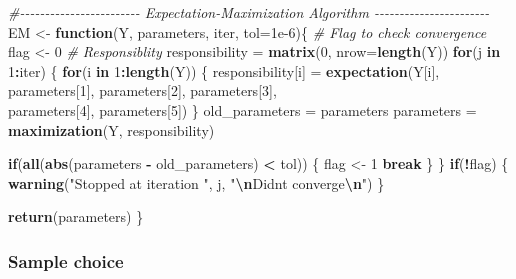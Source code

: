 \documentclass[
]{article}
\newenvironment{Shaded}{\begin{snugshade}}{\end{snugshade}}
\newcommand{\AttributeTok}[1]{\textcolor[rgb]{0.13,0.29,0.53}{#1}}
\newcommand{\CommentTok}[1]{\textcolor[rgb]{0.56,0.35,0.01}{\textit{#1}}}
\newcommand{\ControlFlowTok}[1]{\textcolor[rgb]{0.13,0.29,0.53}{\textbf{#1}}}
\newcommand{\DecValTok}[1]{\textcolor[rgb]{0.00,0.00,0.81}{#1}}
\newcommand{\FloatTok}[1]{\textcolor[rgb]{0.00,0.00,0.81}{#1}}
\newcommand{\FunctionTok}[1]{\textcolor[rgb]{0.13,0.29,0.53}{\textbf{#1}}}
\newcommand{\NormalTok}[1]{#1}
\newcommand{\OtherTok}[1]{\textcolor[rgb]{0.56,0.35,0.01}{#1}}
\newcommand{\SpecialCharTok}[1]{\textcolor[rgb]{0.81,0.36,0.00}{\textbf{#1}}}
\newcommand{\StringTok}[1]{\textcolor[rgb]{0.31,0.60,0.02}{#1}}
\begin{document}
\begin{Shaded}
\begin{Highlighting}[]
\CommentTok{\#{-}{-}{-}{-}{-}{-}{-}{-}{-}{-}{-}{-}{-}{-}{-}{-}{-}{-}{-}{-}{-}{-}{-}{-} Expectation{-}Maximization Algorithm {-}{-}{-}{-}{-}{-}{-}{-}{-}{-}{-}{-}{-}{-}{-}{-}{-}{-}{-}{-}{-}{-}{-}}
\NormalTok{EM }\OtherTok{\textless{}{-}} \ControlFlowTok{function}\NormalTok{(Y, parameters, iter, }\AttributeTok{tol=}\FloatTok{1e{-}6}\NormalTok{)\{}
  \CommentTok{\# Flag to check convergence}
\NormalTok{  flag }\OtherTok{\textless{}{-}} \DecValTok{0}
  \CommentTok{\# Responsiblity }
\NormalTok{  responsibility }\OtherTok{=} \FunctionTok{matrix}\NormalTok{(}\DecValTok{0}\NormalTok{, }\AttributeTok{nrow=}\FunctionTok{length}\NormalTok{(Y))}
  \ControlFlowTok{for}\NormalTok{(j }\ControlFlowTok{in} \DecValTok{1}\SpecialCharTok{:}\NormalTok{iter) \{}
    \ControlFlowTok{for}\NormalTok{(i }\ControlFlowTok{in} \DecValTok{1}\SpecialCharTok{:}\FunctionTok{length}\NormalTok{(Y)) \{}
\NormalTok{      responsibility[i] }\OtherTok{=} \FunctionTok{expectation}\NormalTok{(Y[i], parameters[}\DecValTok{1}\NormalTok{], parameters[}\DecValTok{2}\NormalTok{], parameters[}\DecValTok{3}\NormalTok{],}\\
\NormalTok{parameters[}\DecValTok{4}\NormalTok{], parameters[}\DecValTok{5}\NormalTok{])}
\NormalTok{    \}}
\NormalTok{    old\_parameters }\OtherTok{=}\NormalTok{ parameters}
\NormalTok{    parameters }\OtherTok{=} \FunctionTok{maximization}\NormalTok{(Y, responsibility)}

    \ControlFlowTok{if}\NormalTok{(}\FunctionTok{all}\NormalTok{(}\FunctionTok{abs}\NormalTok{(parameters }\SpecialCharTok{{-}}\NormalTok{ old\_parameters) }\SpecialCharTok{\textless{}}\NormalTok{ tol)) \{}
\NormalTok{      flag }\OtherTok{\textless{}{-}} \DecValTok{1}
      \ControlFlowTok{break}
\NormalTok{    \}}
\NormalTok{  \}}
  \ControlFlowTok{if}\NormalTok{(}\SpecialCharTok{!}\NormalTok{flag) \{}
    \FunctionTok{warning}\NormalTok{(}\StringTok{"Stopped at iteration "}\NormalTok{, j, }\StringTok{"}\SpecialCharTok{\textbackslash{}n}\StringTok{Didn\textquotesingle{}t converge}\SpecialCharTok{\textbackslash{}n}\StringTok{"}\NormalTok{)}
\NormalTok{  \}}

  \FunctionTok{return}\NormalTok{(parameters)}
\NormalTok{\}}
\end{Highlighting}
\end{Shaded}

\subsubsection{Sample choice}\label{sample-choice}
\end{document}
